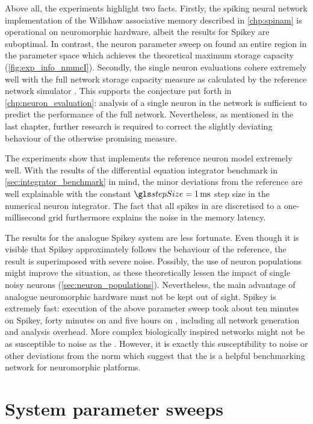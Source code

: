 Above all, the experiments highlight two facts. Firstly, the spiking neural network implementation of the Willshaw associative memory described in \cref{chp:spinam} is operational on neuromorphic hardware, albeit the results for Spikey are suboptimal. In contrast, the neuron parameter sweep on \NMMC found an entire region in the parameter space which achieves the theoretical maximum storage capacity (\cref{fig:exp_info_nmmcI}). Secondly, the single neuron evaluations cohere extremely well with the full network storage capacity measure \info as calculated by the reference network simulator \NEST. This supports the conjecture put forth in \cref{chp:neuron_evaluation}: analysis of a single neuron in the network is sufficient to predict the performance of the full network. Nevertheless, as mentioned in the last chapter, further research is required to correct the slightly deviating behaviour of the otherwise promising \SGMO measure.

The experiments show that \NMMC implements the reference \LIF neuron model extremely well. With the results of the differential equation integrator benchmark in \cref{sec:integrator_benchmark} in mind, the minor deviations from the reference are well explainable with the constant $\stepSize = \SI{1}{\milli\second}$ step size in the \NMMC numerical neuron integrator. The fact that all spikes in \NMMC are discretised to a one-millisecond grid furthermore explains the noise in the memory latency.

The results for the analogue Spikey system are less fortunate. Even though it is visible that Spikey approximately follows the behaviour of the reference, the result is superimposed with severe noise. Possibly, the use of neuron populations might improve the situation, as these theoretically lessen the impact of single noisy neurons (\cref{sec:neuron_populations}). Nevertheless, the main advantage of analogue neuromorphic hardware must not be kept out of sight. Spikey is extremely fast: execution of the above parameter sweep took about ten minutes on Spikey, forty minutes on \NMMC and five hours on \NEST, including all network generation and analysis overhead. More complex biologically inspired networks might not be as susceptible to noise as the \BiNAM. However, it is exactly this susceptibility to noise or other deviations from the norm which suggest that the \BiNAM is a helpful benchmarking network for neuromorphic platforms.


\section{System parameter sweeps}
\label{sec:system_parameter_sweeps}

